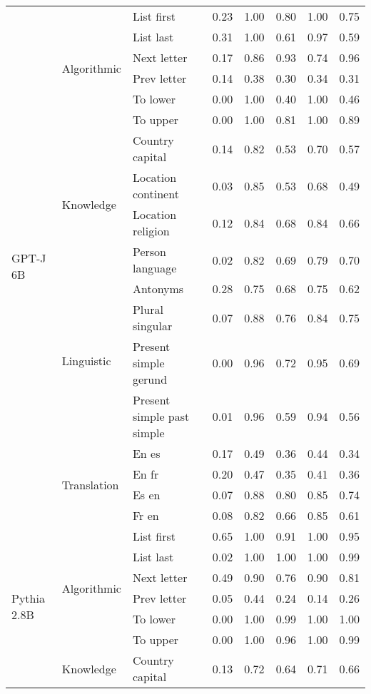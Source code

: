 \begin{center}
\begin{longtable}{lllrrrrr}
\multirow[t]{18}{*}{GPT-J 6B} & \multirow[t]{6}{*}{Algorithmic} & List first & 0.23 & 1.00 & 0.80 & 1.00 & 0.75 \\
 &  & List last & 0.31 & 1.00 & 0.61 & 0.97 & 0.59 \\
 &  & Next letter & 0.17 & 0.86 & 0.93 & 0.74 & 0.96 \\
 &  & Prev letter & 0.14 & 0.38 & 0.30 & 0.34 & 0.31 \\
 &  & To lower & 0.00 & 1.00 & 0.40 & 1.00 & 0.46 \\
 &  & To upper & 0.00 & 1.00 & 0.81 & 1.00 & 0.89 \\
\cline{2-8}
 & \multirow[t]{4}{*}{Knowledge} & Country capital & 0.14 & 0.82 & 0.53 & 0.70 & 0.57 \\
 &  & Location continent & 0.03 & 0.85 & 0.53 & 0.68 & 0.49 \\
 &  & Location religion & 0.12 & 0.84 & 0.68 & 0.84 & 0.66 \\
 &  & Person language & 0.02 & 0.82 & 0.69 & 0.79 & 0.70 \\
\cline{2-8}
 & \multirow[t]{4}{*}{Linguistic} & Antonyms & 0.28 & 0.75 & 0.68 & 0.75 & 0.62 \\
 &  & Plural singular & 0.07 & 0.88 & 0.76 & 0.84 & 0.75 \\
 &  & Present simple gerund & 0.00 & 0.96 & 0.72 & 0.95 & 0.69 \\
 &  & Present simple past simple & 0.01 & 0.96 & 0.59 & 0.94 & 0.56 \\
\cline{2-8}
 & \multirow[t]{4}{*}{Translation} & En es & 0.17 & 0.49 & 0.36 & 0.44 & 0.34 \\
 &  & En fr & 0.20 & 0.47 & 0.35 & 0.41 & 0.36 \\
 &  & Es en & 0.07 & 0.88 & 0.80 & 0.85 & 0.74 \\
 &  & Fr en & 0.08 & 0.82 & 0.66 & 0.85 & 0.61 \\
\cline{1-8} \cline{2-8}
\multirow[t]{18}{*}{Pythia 2.8B} & \multirow[t]{6}{*}{Algorithmic} & List first & 0.65 & 1.00 & 0.91 & 1.00 & 0.95 \\
 &  & List last & 0.02 & 1.00 & 1.00 & 1.00 & 0.99 \\
 &  & Next letter & 0.49 & 0.90 & 0.76 & 0.90 & 0.81 \\
 &  & Prev letter & 0.05 & 0.44 & 0.24 & 0.14 & 0.26 \\
 &  & To lower & 0.00 & 1.00 & 0.99 & 1.00 & 1.00 \\
 &  & To upper & 0.00 & 1.00 & 0.96 & 1.00 & 0.99 \\
\cline{2-8}
 & \multirow[t]{4}{*}{Knowledge} & Country capital & 0.13 & 0.72 & 0.64 & 0.71 & 0.66 \\

\end{longtable}
\end{center}
